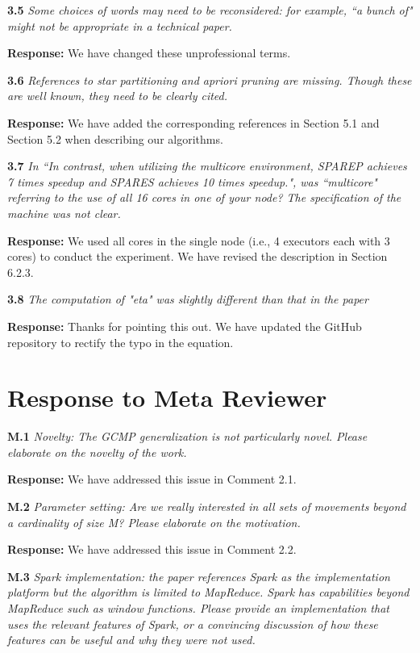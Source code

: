 \documentclass{vldb}
\begin{document}


\textbf{3.5} \emph{Some choices of words may need to be reconsidered: for example, ``a bunch
of" might not be appropriate in a technical paper.}

\textbf{Response:} We have changed these unprofessional terms.



\textbf{3.6} \emph{References to star partitioning and apriori pruning are missing. Though these
are well known, they need to  be clearly cited.}

\textbf{Response:} We have added the corresponding references in Section 5.1 and Section 5.2 when describing our algorithms.

\textbf{3.7} \emph{In ``In contrast, when utilizing the multicore
environment, SPAREP achieves 7 times speedup and SPARES achieves 10 times speedup.", was ``multicore"
referring to the use of all 16 cores in one of your node? The specification of the machine was not clear.}

\textbf{Response:} We used all cores in the single node (i.e., 4 executors each with 3 cores) to conduct the experiment. We have revised the description in Section 6.2.3.



\textbf{3.8} \emph{The computation of "eta" was slightly different than that in the paper}

\textbf{Response:} Thanks for pointing this out.  We have updated the GitHub repository to rectify the typo in the equation.


\section{Response to Meta Reviewer}

\textbf{M.1} \emph{Novelty: The GCMP generalization is not particularly novel. Please elaborate on the novelty of the work.}

\textbf{Response:} We have addressed this issue in Comment 2.1. 


\textbf{M.2} \emph{Parameter setting: Are we really interested in all sets of movements beyond a cardinality of size M? Please elaborate
on the motivation.}

\textbf{Response:} We have addressed this issue in Comment 2.2. 

\textbf{M.3} \emph{Spark implementation: the paper references Spark as the implementation platform but the algorithm is limited to MapReduce. Spark has capabilities beyond MapReduce such as window functions. Please provide an implementation that uses the relevant features of Spark, or a convincing discussion of how these features can be useful and why they were not used.}
\end{document}
